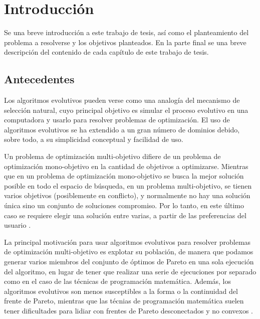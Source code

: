 \chapter*{Introducci\'on}
  Se \DIFdelbegin {}\DIFdelend \DIFaddbegin {}\DIFaddend una breve introducci\'on a este trabajo de tesis, as\'i como el planteamiento del problema 
  a resolverse y los objetivos planteados. En la parte final se \DIFdelbegin {}\DIFdelend \DIFaddbegin {}\DIFaddend una breve descripci\'on 
  del contenido de cada cap\'itulo de este trabajo de tesis.

\section*{Antecedentes}

  Los algoritmos evolutivos pueden verse como una analog\'ia del mecanismo de selecci\'on natural, cuyo principal objetivo es 
  simular el proceso evolutivo en una computadora y usarlo para resolver problemas de optimizaci\'on. El uso de 
  algoritmos evolutivos se ha extendido a un gran n\'umero de dominios debido, sobre todo, a su simplicidad conceptual
  y facilidad de uso.

  Un problema de optimizaci\'on multi-objetivo difiere de un problema de  optimizaci\'on mono-objetivo en la cantidad de 
  objetivos a optimizarse. Mientras que en un problema de optimizaci\'on mono-objetivo se busca la mejor soluci\'on posible 
  en todo el espacio de b\'usqueda, en un problema multi-objetivo, se tienen varios objetivos (posiblemente 
  en conflicto), y normalmente no hay una soluci\'on \'unica sino un conjunto de soluciones compromiso. Por lo tanto, en este 
  \'ultimo caso se requiere elegir una soluci\'on entre varias, a partir de las preferencias del usuario \DIFaddbegin \cite{Miettinen98}\DIFaddend .

  La principal motivaci\'on para usar algoritmos evolutivos para resolver problemas de optimizaci\'on multi-objetivo  
  es explotar su poblaci\'on, de manera que podamos generar varios miembros del conjunto de \'optimos de Pareto en una sola 
  ejecuci\'on del algoritmo, en lugar de tener que realizar una serie de ejecuciones por separado como en el caso de las 
  t\'ecnicas de programaci\'on matem\'atica. Adem\'as, los algoritmos evolutivos son menos susceptibles a la forma o la 
  continuidad del frente de Pareto, mientras que las t\'ecnias de programaci\'on matem\'atica suelen tener dificultades 
  para lidiar con frentes de Pareto desconectados y no convexos \DIFaddbegin \cite{EASMC85}\DIFaddend .

